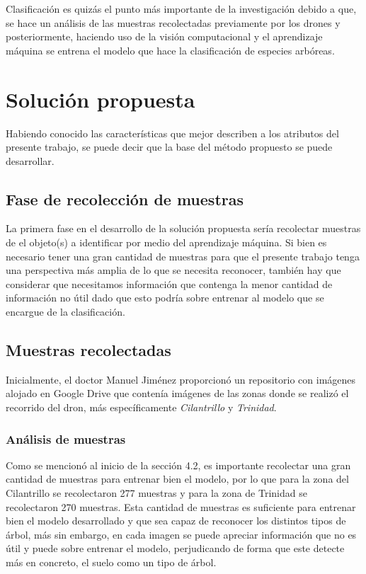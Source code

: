 Clasificación es quizás el punto más importante de la investigación debido a que, se hace un análisis de las muestras recolectadas previamente por los drones y posteriormente, haciendo uso de la visión computacional y el aprendizaje máquina se entrena el modelo que hace la clasificación de especies arbóreas.


\chapter{Solución propuesta}
Habiendo conocido las características que mejor describen a los atributos del presente trabajo, se puede decir que la base del método propuesto se puede desarrollar.

\section{Fase de recolección de muestras}
La primera fase en el desarrollo de la solución propuesta sería recolectar muestras de el objeto(s) a identificar por medio del aprendizaje máquina. Si bien es necesario tener una gran cantidad de muestras para que el presente trabajo tenga una perspectiva más amplia de lo que se necesita reconocer, también hay que considerar que necesitamos información que contenga la menor cantidad de información no útil dado que esto podría sobre entrenar al modelo que se encargue de la clasificación.

\section{Muestras recolectadas}
Inicialmente, el doctor Manuel Jiménez proporcionó un repositorio con imágenes alojado en Google Drive que contenía imágenes de las zonas donde se realizó el recorrido del dron, más específicamente \emph{Cilantrillo} y \emph{Trinidad}.

\begin{figure}
 \centering
 \par
{}
\end{figure}

\subsection{Análisis de muestras}
Como se mencionó al inicio de la sección 4.2, es importante recolectar una gran cantidad de muestras para entrenar bien el modelo, por lo que para la zona del Cilantrillo se recolectaron 277 muestras y para la zona de Trinidad se recolectaron 270 muestras. Esta cantidad de muestras es suficiente para entrenar bien el modelo desarrollado y que sea capaz de reconocer los distintos tipos de árbol, más sin embargo, en cada imagen se puede apreciar información que no es útil y puede sobre entrenar el modelo, perjudicando de forma que este detecte más en concreto, el suelo como un tipo de árbol.

